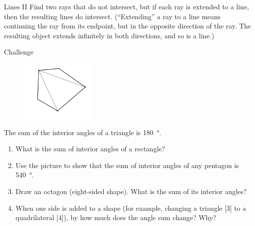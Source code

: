 \documentclass[14pt,letterpaper]{article}
\begin{document}
\begin{problem}{Lines II}
 Find two rays that do not intersect, but if each ray is extended to a line,
 then the resulting lines do intersect. (``Extending'' a ray to a line means
 continuing the ray from its endpoint, but in the opposite direction of the
 ray. The resulting object extends infinitely in both directions, and so is a
 line.)
\end{problem}

\begin{problem}{Challenge}

\begin{figure}
 \includegraphics[width=10em]{pentagon.png}
\end{figure}

The sum of the interior angles of a triangle is \SI{180}{\degree}.

\begin{enumerate}
 \item What is the sum of interior angles of a rectangle?
 \item Use the picture to show that the sum of interior angles of any pentagon
 is \SI{540}{\degree}.
 \item Draw an octagon (eight-sided shape). What is the sum of its interior
 angles?
 \item When one side is added to a shape (for example, changing a triangle
 [$3$] to a quadrilateral [$4$]), by how much does the angle sum change? Why?
\end{enumerate}

\end{problem}
\end{document}

